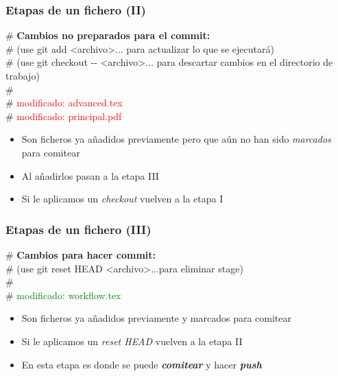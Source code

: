 \frame
{
\frametitle{Etapas de un fichero (II)}
\begin{framed}
\# \textbf{Cambios no preparados para el commit:}\\
\#   (use git add <archivo>... para actualizar lo que se ejecutará)\\
\#   (use git checkout -{}- <archivo>... para descartar cambios en el directorio de trabajo)\\
\#\\
\#	\textcolor{red}{modificado:   advanced.tex}\\
\#	\textcolor{red}{modificado:   principal.pdf}\\
\end{framed}

\begin{itemize}
 \item Son ficheros ya añadidos previamente pero que aún no han sido \textit{marcados} para comitear
 \item Al añadirlos pasan a la etapa III
 \item Si le aplicamos un \textit{checkout} vuelven a la etapa I
\end{itemize}
}

\frame
{
\frametitle{Etapas de un fichero (III)}
\begin{framed}
\# \textbf{Cambios para hacer commit:}\\
\#   (use git reset HEAD <archivo>...para eliminar stage)\\
\#\\
\#	\textcolor{green}{modificado:   workflow.tex}\\
\end{framed}

\begin{itemize}
 \item Son ficheros ya añadidos previamente y marcados para comitear
 \item Si le aplicamos un \textit{reset HEAD} vuelven a la etapa II
 \item En esta etapa es donde se puede \textit{\textbf{comitear}} y hacer \textit{\textbf{push}}
\end{itemize}
}

